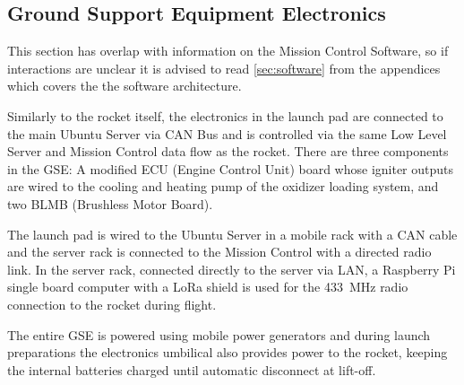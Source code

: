\subsection{Ground Support Equipment Electronics}

This section has overlap with information on the Mission Control Software, so if interactions are unclear it is advised to read \cref{sec:software} from the appendices which covers the the software architecture.

Similarly to the rocket itself, the electronics in the launch pad are connected to the main Ubuntu Server via CAN Bus and is controlled via the same Low Level Server and Mission Control data flow as the rocket. There are three components in the GSE: A modified ECU (Engine Control Unit) board whose igniter outputs are wired to the cooling and heating pump of the oxidizer loading system, and two BLMB (Brushless Motor Board).

The launch pad is wired to the Ubuntu Server in a mobile rack with a CAN cable and the server rack is connected to the Mission Control with a directed radio link. In the server rack, connected directly to the server via LAN, a Raspberry Pi single board computer with a LoRa shield is used for the \SI{433}{\mega\hertz} radio connection to the rocket during flight.

The entire GSE is powered using mobile power generators and during launch preparations the electronics umbilical also provides power to the rocket, keeping the internal batteries charged until automatic disconnect at lift-off.